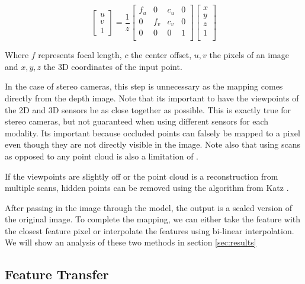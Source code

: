 \documentclass[10pt,twocolumn,letterpaper]{article}
\newcommand{\AJ}[1]{{\color{red}{[Andrej: #1]}}}
\begin{document}
\begin{equation}
    \begin{bmatrix}
        u \\
        v \\
        1
    \end{bmatrix} = \frac{1}{z}
    \begin{bmatrix}
        f_u & 0   & c_u & 0 \\
        0   & f_v & c_v & 0 \\
        0   & 0   & 0   & 1 \\
    \end{bmatrix}
    \begin{bmatrix}
        x \\
        y \\
        z \\
        1 \\
    \end{bmatrix}
    \label{eq:pinhole}
\end{equation}

\AJ{Is this equation necessary or is this considered common knowledge}

Where $f$ represents focal length, $c$ the center offset, $u,v$ the pixels of an image and $x,y,z$ the 3D coordinates of the input point.

In the case of stereo cameras, this step is unnecessary as the mapping comes directly from the depth image. Note that its important to have the viewpoints of the 2D and 3D sensors be as close together as possible. This is exactly true for stereo cameras, but not guaranteed when using different sensors for each modality. Its important because occluded points can falsely be mapped to a pixel even though they are not directly visible in the image. Note also that using scans as opposed to any point cloud is also a limitation of \cite{xie2020pointcontrast}.

If the viewpoints are slightly off or the point cloud is a reconstruction from multiple scans, hidden points can be removed using the algorithm from Katz \etal \cite{katz2007Direct}.

After passing in the image through the model, the output is a scaled version of the original image. To complete the mapping, we can either take the feature with the closest feature pixel or interpolate the features using bi-linear interpolation. We will show an analysis of these two methods in section \ref{sec:results}

\subsection{Feature Transfer}
\label{sec:featureTransfer}
\end{document}
